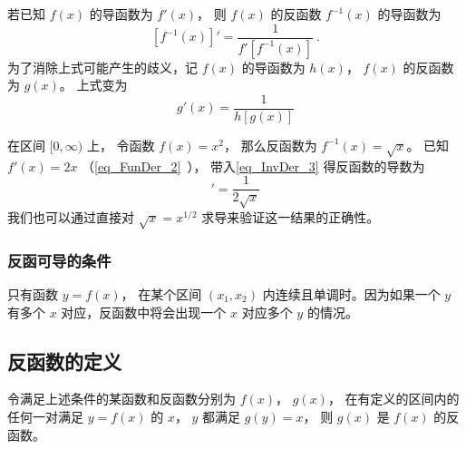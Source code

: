 

若已知 $f(x)$ 的导函数为 $f'(x)$， 则 $f(x)$ 的反函数 $f^{-1}(x)$ 的导函数为
\begin{equation}\label{eq_InvDer_3}
[f^{-1}(x)]' = \frac{1}{f'[f^{-1}(x)]} ~.
\end{equation} 
为了消除上式可能产生的歧义，记 $f(x)$ 的导函数为 $h(x)$，  $f(x)$ 的反函数为 $g(x)$。 上式变为
 \begin{equation}
g'(x) = \frac{1}{h[g(x)]}
\end{equation}

\begin{example}{}
在区间 $[0, \infty)$ 上， 令函数 $f(x) = x^2$， 那么反函数为 $f^{-1}(x) = \sqrt{x}$。 已知 $f'(x) = 2x$ （\autoref{eq_FunDer_2}~）， 带入\autoref{eq_InvDer_3} 得反函数的导数为
\begin{equation}
[f^{-1}(x)]' = \frac{1}{2\sqrt{x}} 
\end{equation}
我们也可以通过直接对 $\sqrt{x} = x^{1/2}$ 求导来验证这一结果的正确性。
\end{example}

\subsubsection{反函可导的条件}
只有函数 $y = f(x)$， 在某个区间 $(x_1, x_2)$ 内连续且单调时。因为如果一个 $y$ 有多个 $x$ 对应，反函数中将会出现一个 $x$ 对应多个 $y$ 的情况。

\subsection{反函数的定义}
令满足上述条件的某函数和反函数分别为 $f(x)$，  $g(x)$， 在有定义的区间内的任何一对满足 $y = f(x)$ 的 $x$，  $y$ 都满足 $g(y) = x$， 则 $g(x)$ 是 $f(x)$ 的反函数。


